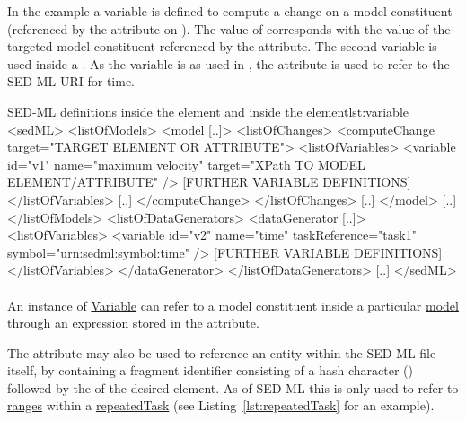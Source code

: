 In the example a variable  is defined to compute a change on a model constituent (referenced by the \hyperref[sec:target]{} attribute on \hyperref[class:computeChange]{}). The value of  corresponds with the value of the targeted model constituent referenced by the  attribute. The second variable  is used inside a \hyperref[class:dataGenerator]{}. As the variable is  as used in , the \hyperref[sec:symbol]{} attribute is used to refer to the SED-ML URI for time.

\begin{myXmlLst}{SED-ML  definitions inside the  element and inside the  element}{lst:variable}
<sedML>
	<listOfModels>
		<model [..]>
			<listOfChanges>
				<computeChange target="TARGET ELEMENT OR ATTRIBUTE">
				<listOfVariables>
				   <variable id="v1" name="maximum velocity" target="XPath TO MODEL ELEMENT/ATTRIBUTE" />
				   [FURTHER VARIABLE DEFINITIONS]
				</listOfVariables>
				[..]
				</computeChange>
			</listOfChanges>
			[..]
		</model>
		[..]
	</listOfModels>
	<listOfDataGenerators>
		<dataGenerator [..]>
			<listOfVariables>
				<variable id="v2" name="time" taskReference="task1" symbol="urn:sedml:symbol:time" />
				[FURTHER VARIABLE DEFINITIONS]
			</listOfVariables>
		</dataGenerator>
	</listOfDataGenerators>
	[..]
</sedML>
\end{myXmlLst}


\paragraph*{}
\label{sec:target}
An instance of \hyperref[class:variable]{Variable} can refer to a model constituent inside a particular \hyperref[class:model]{model} through an  expression stored in the  attribute. 

The  attribute may also be used to reference an entity within the SED-ML file itself, by containing a fragment identifier consisting of a hash character (\code{\#}) followed by the \hyperref[type:sid]{} of the desired element. As of SED-ML \currentLV this is only used to refer to \hyperref[sec:listOfRanges]{ranges} within a \hyperref[class:repeatedTask]{repeatedTask} (see Listing~\ref{lst:repeatedTask} for an example).

